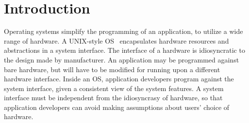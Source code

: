\chapter{Introduction}
\label{chap:intro}


Operating systems simplify the programming of an application, to utilize a wide range of hardware.
A UNIX-style OS~\cite{ritchie74unix}
encapsulates hardware resources and abstractions in a system interface.
The interface of a hardware
is idiosyncratic to the design made by manufacturer.
An application may be programmed against bare hardware, but will have to be modified for running upon a different hardware interface.
Inside an OS, application developers program against the system interface, given a consistent view of the system features.
A system interface must be independent from the idiosyncrasy of hardware,
so that application developers can avoid making assumptions about users' choice of hardware.



















